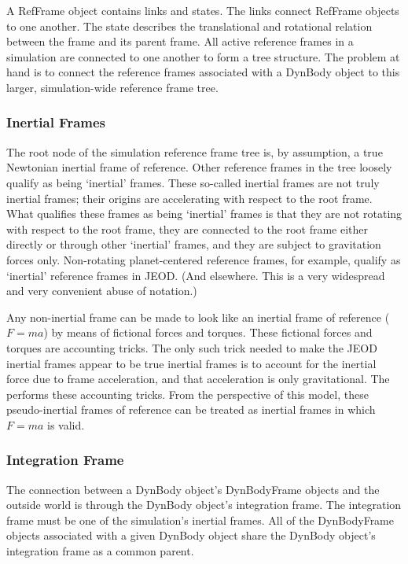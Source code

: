 A RefFrame object contains links and states. The links connect RefFrame
objects to one another. The state describes the
translational and rotational relation between the frame and its parent frame.
All active reference frames in a simulation are connected to one another to
form a tree structure. The problem at hand is to connect the reference frames
associated with a DynBody object to this larger, simulation-wide reference
frame tree.

\subsubsection{Inertial Frames}
The root node of the simulation reference frame tree is, by
assumption, a true Newtonian inertial frame of reference. Other reference
frames in the tree loosely qualify as being `inertial' frames. These so-called
inertial frames are not truly inertial frames; their origins are accelerating
with respect to the root frame. What qualifies these frames as being `inertial'
frames is that they are not rotating with respect to the root frame,
they are connected to the root frame either directly or through other
`inertial' frames, and they are subject to gravitation forces only.
Non-rotating planet-centered reference frames, for example, qualify as
`inertial' reference frames in JEOD. (And elsewhere. This is a very
widespread and very convenient abuse of notation.)

Any non-inertial frame can be made to look like an inertial frame of reference
(\ie $F=ma$) by means of fictional forces and torques. These fictional forces
and torques are accounting tricks. The only such trick needed to make the JEOD
inertial frames appear to be true inertial frames is to account for the
inertial force due to frame acceleration, and that acceleration is only
gravitational. The  performs these accounting tricks.
From the perspective of this model, these pseudo-inertial frames of reference
can be treated as inertial frames in which $F=ma$ is valid.

\subsubsection{Integration Frame}
The connection between a DynBody object's DynBodyFrame objects and the outside
world is through the DynBody object's integration frame. The integration frame
must be one of the simulation's inertial frames. All of the DynBodyFrame objects
associated with a given DynBody object share the DynBody object's integration
frame as a common parent.

